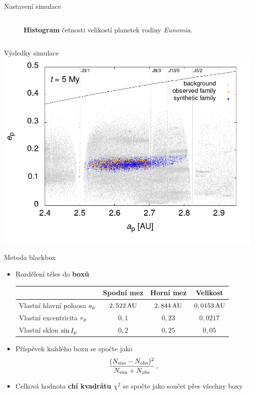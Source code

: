 \documentclass[xcolor=dvipsnames]{beamer}
\begin{document}
\begin{frame}[t]{\secname}{Nastavení simulace}
\begin{columns}
\begin{column}{0.4\textwidth}
\begin{figure}
			\caption{\textbf{Histogram} četnosti velikostí planetek rodiny \textit{Eunomia}.}
		\end{figure}
	\end{column}
	\end{columns}
\end{frame}

\begin{frame}[t]{\secname}{Výsledky simulace}
	\centering
	\includegraphics[width=0.8\paperwidth]{../obr/ae_5_trans.png}
\end{frame}

\begin{frame}[t]{\secname}{Metoda blackbox}
	\begin{itemize}
		\item Rozdělení těles do \textbf{boxů}

		\begin{table}
		\centering
{\footnotesize
			\begin{tabularx}{0.9\textwidth}{|X||c|c|c|}
				\hline
				& Spodní mez & Horní mez & Velikost  \\
				\hline \hline
				Vlastní hlavní poloosa $a_{\rm p}$ & $2,522\,{\rm AU}$ & $2,844\,{\rm AU}$ & $0,0153\,{\rm AU}$ \\
				\hline
				Vlastní excentricita $e_{\rm p}$ & $0,1$ & $0,23$ & $0,0217$ \\
				\hline
				Vlastní sklon $\sin I_{\rm p}$ & $0,2$ & $0,25$ & $0,05$ \\
				\hline
			\end{tabularx}
}
		\end{table}

		\item Příspěvek každého boxu se spočte jako
		\begin{align*}
		\frac{(N_{\rm sim}-N_{\rm obs})^2}{N_{\rm sim}+N_{\rm obs}}\,,
		\end{align*}
		\item Celková hodnota \textbf{chí kvadrátu} $\chi^2$ se spočte jako součet přes všechny boxy
	\end{itemize}
\end{frame}
\end{document}
